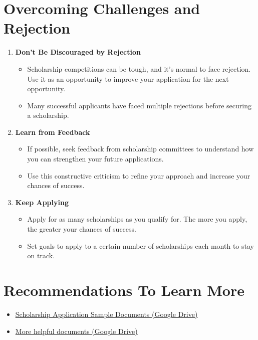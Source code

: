 \documentclass[
  letterpaper,
  DIV=11,
  numbers=noendperiod]{scrreprt}
\providecommand{\tightlist}{%
  \setlength{\itemsep}{0pt}\setlength{\parskip}{0pt}}\usepackage{longtable,booktabs,array}
\begin{document}
\section{Overcoming Challenges and
Rejection}\label{overcoming-challenges-and-rejection}

\begin{enumerate}
\def\labelenumi{\arabic{enumi}.}
\item
  \textbf{Don't Be Discouraged by Rejection}

  \begin{itemize}
  \tightlist
  \item
    Scholarship competitions can be tough, and it's normal to face
    rejection. Use it as an opportunity to improve your application for
    the next opportunity.
  \item
    Many successful applicants have faced multiple rejections before
    securing a scholarship.
  \end{itemize}
\item
  \textbf{Learn from Feedback}

  \begin{itemize}
  \tightlist
  \item
    If possible, seek feedback from scholarship committees to understand
    how you can strengthen your future applications.
  \item
    Use this constructive criticism to refine your approach and increase
    your chances of success.
  \end{itemize}
\item
  \textbf{Keep Applying}

  \begin{itemize}
  \tightlist
  \item
    Apply for as many scholarships as you qualify for. The more you
    apply, the greater your chances of success.
  \item
    Set goals to apply to a certain number of scholarships each month to
    stay on track.
  \end{itemize}
\end{enumerate}

\section{Recommendations To Learn
More}\label{recommendations-to-learn-more-5}

\begin{itemize}
\item
  \href{https://drive.google.com/drive/mobile/folders/1UVI5yT-5JfMwyHHloxPwkuuPm08L_zBn}{Scholarship
  Application Sample Documents (Google Drive)}
\item
  \href{https://drive.google.com/drive/u/0/mobile/folders/1i_3ZhbdMxB772sI48LrfITapSlb6La-5}{More
  helpful documents (Google Drive)}
\end{itemize}
\end{document}
